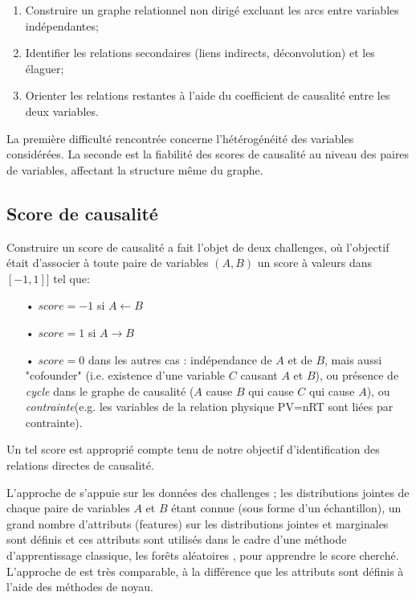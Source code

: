 \documentclass[11pt,fleqn,openany,frenchb]{book} %
\def\NOTE#1{\footnote{MS : #1}}
\begin{document}
\begin{enumerate}
\item Construire un graphe relationnel non dirigé excluant les arcs entre variables indépendantes;  \item Identifier les relations secondaires (liens indirects, déconvolution) et les élaguer; 
\item Orienter les relations restantes à l'aide du coefficient de causalité entre les deux variables. 
\end{enumerate}

La première difficulté rencontrée concerne l'hétérogénéité des variables considérées. La seconde est la fiabilité des scores de causalité au niveau des paires de variables, affectant la structure même du graphe. 

\subsection{Score de causalité}
Construire un score de causalité a fait l'objet de deux challenges, où l'objectif était d'associer à toute paire de variables $(A,B)$ un score à valeurs dans $[-1,1]]$ tel que: 

\begin{itemize}
\item[•] $score = -1$ si $A\leftarrow B$
\item[•] $score = 1$ si $A\rightarrow B$
\item[•] $score= 0$ dans les autres cas : indépendance de $A$ et de $B$, mais aussi "cofounder" (i.e. existence d'une variable $C$ causant $A$ et $B$), ou présence de \textit{cycle} dans le graphe de causalité ($A$ cause $B$ qui cause $C$ qui cause $A$), ou  \textit{contrainte}(e.g. les variables de la relation physique PV=nRT sont liées par contrainte).\vspace{0.3cm}
\end{itemize}

Un tel score est approprié compte tenu de notre objectif d'identification des relations directes de causalité. 

L'approche de \cite{follonosa2016causalityvar} s'appuie sur les données des challenges ; les distributions jointes de chaque paire de variables $A$ et $B$ étant connue (sous forme d'un échantillon), un grand nombre d'attributs (features) sur les distributions jointes et marginales sont définis et ces attributs sont utilisés dans le cadre d'une méthode d'apprentissage classique, les forêts aléatoires \cite{breiman2001random}, pour apprendre le score cherché. L'approche de  \cite{lopez-paz2015learningcausality} est très comparable, à la différence que les attributs sont définis à l'aide des méthodes de noyau.
\end{document}
